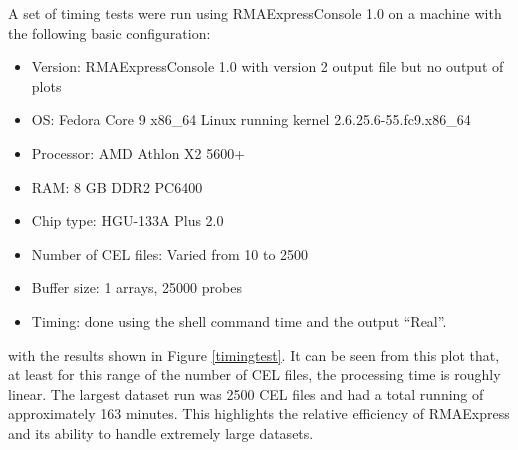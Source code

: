 \documentclass[11pt]{report}
\begin{document}
A set of timing tests were run using RMAExpressConsole 1.0 on a machine with the following basic configuration:
\begin{itemize}
\item Version: RMAExpressConsole 1.0 with version 2 output file but no output of plots
\item OS: Fedora Core 9 x86\_64 Linux running kernel 2.6.25.6-55.fc9.x86\_64
\item Processor: AMD Athlon X2 5600+ 
\item RAM: 8 GB DDR2 PC6400
\item Chip type: HGU-133A Plus 2.0
\item Number of CEL files: Varied from 10 to 2500
\item Buffer size: 1 arrays, 25000 probes 
\item Timing: done using the shell command time and the output ``Real''.
\end{itemize}
with the results shown in Figure \ref{timingtest}. It can be seen from this plot that, at least for this range of the number of CEL files, the processing time is roughly linear. The largest dataset run was 2500 CEL files and had a total running of approximately 163 minutes. This highlights the relative efficiency of RMAExpress and its ability to handle extremely large datasets.


  
\end{document}
